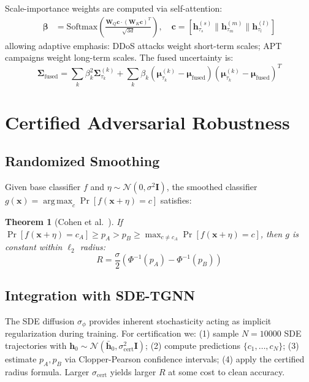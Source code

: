 \documentclass[10pt,journal,compsoc]{IEEEtran}
\newcommand{\N}{\mathcal{N}}
\DeclareMathOperator*{\argmax}{arg\,max}
\newtheorem{theorem}{Theorem}
\begin{document}
Scale-importance weights are computed via self-attention:
\begin{align}
\boldsymbol{\beta} &= \text{Softmax}\!\left(\frac{\mathbf{W}_Q \mathbf{c} \cdot (\mathbf{W}_K \mathbf{c})^T}{\sqrt{3d}}\right), \quad \mathbf{c} = [\mathbf{h}_{\tau_s}^{(s)} \| \mathbf{h}_{\tau_m}^{(m)} \| \mathbf{h}_{\tau_l}^{(l)}]
\end{align}
allowing adaptive emphasis: DDoS attacks weight short-term scales; APT campaigns weight long-term scales. The fused uncertainty is:
\begin{equation}
\boldsymbol{\Sigma}_{\text{fused}} = \sum_k \beta_k^2\boldsymbol{\Sigma}_{\tau_k}^{(k)} + \sum_k \beta_k(\boldsymbol{\mu}_{\tau_k}^{(k)}-\boldsymbol{\mu}_{\text{fused}})(\boldsymbol{\mu}_{\tau_k}^{(k)}-\boldsymbol{\mu}_{\text{fused}})^T
\end{equation}

\vspace{-0.2cm}
\section{Certified Adversarial Robustness}
\label{sec:robustness}

\vspace{-0.2cm}
\subsection{Randomized Smoothing}

Given base classifier $f$ and $\eta \sim \N(0,\sigma^2\mathbf{I})$, the smoothed classifier $g(\mathbf{x}) = \argmax_c \Pr[f(\mathbf{x}+\eta)=c]$ satisfies:

\begin{theorem}[Cohen et al.~\cite{cohen2019certified}]
If $\Pr[f(\mathbf{x}+\eta)=c_A] \ge p_A > p_B \ge \max_{c\ne c_A}\Pr[f(\mathbf{x}+\eta)=c]$, then $g$ is constant within $\ell_2$ radius:
\begin{equation}
R = \frac{\sigma}{2}(\Phi^{-1}(p_A) - \Phi^{-1}(p_B))
\end{equation}
\end{theorem}

\vspace{-0.2cm}
\subsection{Integration with SDE-TGNN}

The SDE diffusion $\sigma_\phi$ provides inherent stochasticity acting as implicit regularization during training. For certification we: (1) sample $N{=}10000$ SDE trajectories with $\mathbf{h}_0 \sim \N(\bar{\mathbf{h}}_0, \sigma_{\text{cert}}^2\mathbf{I})$; (2) compute predictions $\{c_1,\ldots,c_N\}$; (3) estimate $p_A, p_B$ via Clopper-Pearson confidence intervals; (4) apply the certified radius formula. Larger $\sigma_{\text{cert}}$ yields larger $R$ at some cost to clean accuracy.
\end{document}
